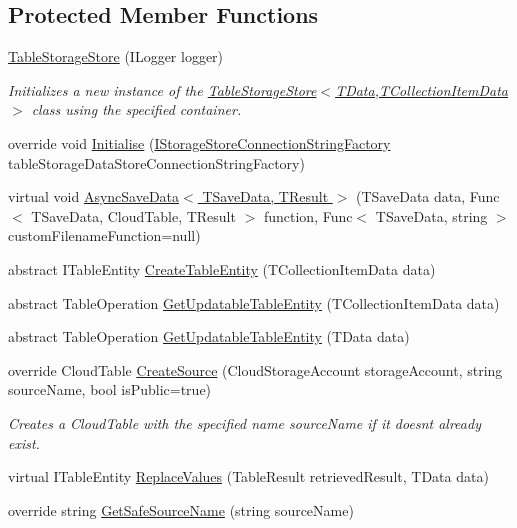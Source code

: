 \subsection*{Protected Member Functions}
\begin{DoxyCompactItemize}
\item 
\hyperlink{classCqrs_1_1Azure_1_1BlobStorage_1_1TableStorageStore_aabc36bc46ffb22b716cc7769a641cfab}{Table\+Storage\+Store} (I\+Logger logger)
\begin{DoxyCompactList}\small\item\em Initializes a new instance of the \hyperlink{classCqrs_1_1Azure_1_1BlobStorage_1_1TableStorageStore_aabc36bc46ffb22b716cc7769a641cfab}{Table\+Storage\+Store$<$\+T\+Data,\+T\+Collection\+Item\+Data$>$} class using the specified container. \end{DoxyCompactList}\item 
override void \hyperlink{classCqrs_1_1Azure_1_1BlobStorage_1_1TableStorageStore_ae775f039a168cc48c731314c7e494bb6}{Initialise} (\hyperlink{interfaceCqrs_1_1Azure_1_1BlobStorage_1_1IStorageStoreConnectionStringFactory}{I\+Storage\+Store\+Connection\+String\+Factory} table\+Storage\+Data\+Store\+Connection\+String\+Factory)
\item 
virtual void \hyperlink{classCqrs_1_1Azure_1_1BlobStorage_1_1TableStorageStore_a1a1dcf73501d4e7fc23e8137627de6f7}{Async\+Save\+Data$<$ T\+Save\+Data, T\+Result $>$} (T\+Save\+Data data, Func$<$ T\+Save\+Data, Cloud\+Table, T\+Result $>$ function, Func$<$ T\+Save\+Data, string $>$ custom\+Filename\+Function=null)
\item 
abstract I\+Table\+Entity \hyperlink{classCqrs_1_1Azure_1_1BlobStorage_1_1TableStorageStore_a168a634f7f55bd264e01bd7e0f1f9f15}{Create\+Table\+Entity} (T\+Collection\+Item\+Data data)
\item 
abstract Table\+Operation \hyperlink{classCqrs_1_1Azure_1_1BlobStorage_1_1TableStorageStore_a1308b107766a375b7b8dcc92d9080393}{Get\+Updatable\+Table\+Entity} (T\+Collection\+Item\+Data data)
\item 
abstract Table\+Operation \hyperlink{classCqrs_1_1Azure_1_1BlobStorage_1_1TableStorageStore_ae476c94b77d9c602aef934bd8c1b20ea}{Get\+Updatable\+Table\+Entity} (T\+Data data)
\item 
override Cloud\+Table \hyperlink{classCqrs_1_1Azure_1_1BlobStorage_1_1TableStorageStore_ad504317a3b2c07172f50b8e7b8d0f78e}{Create\+Source} (Cloud\+Storage\+Account storage\+Account, string source\+Name, bool is\+Public=true)
\begin{DoxyCompactList}\small\item\em Creates a Cloud\+Table with the specified name {\itshape source\+Name}  if it doesn\textquotesingle{}t already exist. \end{DoxyCompactList}\item 
virtual I\+Table\+Entity \hyperlink{classCqrs_1_1Azure_1_1BlobStorage_1_1TableStorageStore_adc625eceee6e2b190997a771740e01b9}{Replace\+Values} (Table\+Result retrieved\+Result, T\+Data data)
\item 
override string \hyperlink{classCqrs_1_1Azure_1_1BlobStorage_1_1TableStorageStore_a7b9e49aa8017ff3c55b184b956a150d0}{Get\+Safe\+Source\+Name} (string source\+Name)
\end{DoxyCompactItemize}
